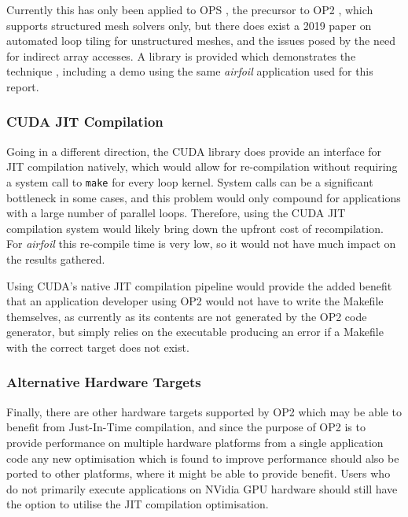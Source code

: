 Currently this has only been applied to OPS \cite{opstiling}, the precursor to OP2 \cite{opsmain}, which supports structured mesh solvers only, but there does exist a 2019 paper \cite{slope} on automated loop tiling for unstructured meshes, and the issues posed by the need for indirect array accesses. A library is provided which demonstrates the technique \cite{SLOPErep}, including a demo using the same \textit{airfoil} application used for this report.

\subsubsection{CUDA JIT Compilation}
Going in a different direction, the CUDA library does provide an interface for JIT compilation natively, which would allow for re-compilation without requiring a system call to \verb|make| for every loop kernel. System calls can be a significant bottleneck in some cases, and this problem would only compound for applications with a large number of parallel loops. Therefore, using the CUDA JIT compilation system would likely bring down the upfront cost of recompilation. For \textit{airfoil} this re-compile time is very low, so it would not have much impact on the results gathered.
\par
Using CUDA's native JIT compilation pipeline would provide the added benefit that an application developer using OP2 would not have to write the Makefile themselves, as currently as its contents are not generated by the OP2 code generator, but simply relies on the executable producing an error if a Makefile with the correct target does not exist.

\subsubsection{Alternative Hardware Targets}
Finally, there are other hardware targets supported by OP2 which may be able to benefit from Just-In-Time compilation, and since the purpose of OP2 is to provide performance on multiple hardware platforms from a single application code any new optimisation which is found to improve performance should also be ported to other platforms, where it might be able to provide benefit. Users who do not primarily execute applications on NVidia GPU hardware should still have the option to utilise the JIT compilation optimisation.

\clearpage
